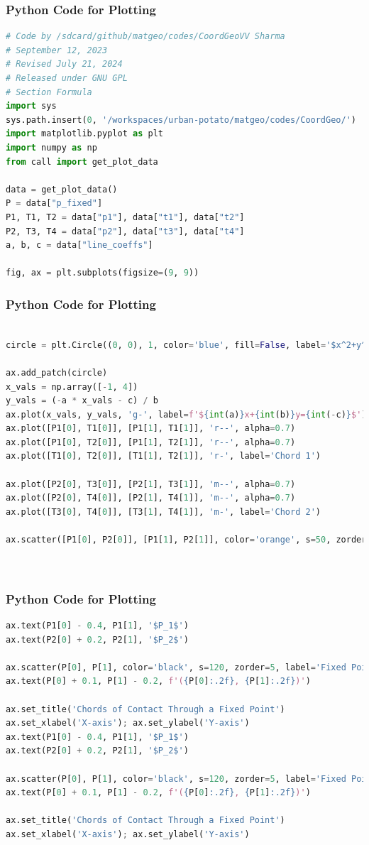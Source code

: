 \documentclass{beamer}
\theoremstyle{remark}
\numberwithin{equation}{section}
\begin{document}
\begin{frame}[fragile]
\frametitle{Python Code for Plotting}
\begin{lstlisting}[language=Python]
# Code by /sdcard/github/matgeo/codes/CoordGeoVV Sharma
# September 12, 2023
# Revised July 21, 2024
# Released under GNU GPL
# Section Formula
import sys
sys.path.insert(0, '/workspaces/urban-potato/matgeo/codes/CoordGeo/') 
import matplotlib.pyplot as plt
import numpy as np
from call import get_plot_data

data = get_plot_data()
P = data["p_fixed"]
P1, T1, T2 = data["p1"], data["t1"], data["t2"]
P2, T3, T4 = data["p2"], data["t3"], data["t4"]
a, b, c = data["line_coeffs"]

fig, ax = plt.subplots(figsize=(9, 9))


\end{lstlisting}
\end{frame}
\begin{frame}[fragile]
\frametitle{Python Code for Plotting}
\begin{lstlisting}[language=Python]

circle = plt.Circle((0, 0), 1, color='blue', fill=False, label='$x^2+y^2=1$')

ax.add_patch(circle)
x_vals = np.array([-1, 4])
y_vals = (-a * x_vals - c) / b
ax.plot(x_vals, y_vals, 'g-', label=f'${int(a)}x+{int(b)}y={int(-c)}$')
ax.plot([P1[0], T1[0]], [P1[1], T1[1]], 'r--', alpha=0.7)
ax.plot([P1[0], T2[0]], [P1[1], T2[1]], 'r--', alpha=0.7)
ax.plot([T1[0], T2[0]], [T1[1], T2[1]], 'r-', label='Chord 1')

ax.plot([P2[0], T3[0]], [P2[1], T3[1]], 'm--', alpha=0.7)
ax.plot([P2[0], T4[0]], [P2[1], T4[1]], 'm--', alpha=0.7)
ax.plot([T3[0], T4[0]], [T3[1], T4[1]], 'm-', label='Chord 2')

ax.scatter([P1[0], P2[0]], [P1[1], P2[1]], color='orange', s=50, zorder=5)

           
\end{lstlisting}
\end{frame}
 \begin{frame}[fragile]
\frametitle{Python Code for Plotting}
\begin{lstlisting}[language=Python]
ax.text(P1[0] - 0.4, P1[1], '$P_1$')
ax.text(P2[0] + 0.2, P2[1], '$P_2$')

ax.scatter(P[0], P[1], color='black', s=120, zorder=5, label='Fixed Point')
ax.text(P[0] + 0.1, P[1] - 0.2, f'({P[0]:.2f}, {P[1]:.2f})')

ax.set_title('Chords of Contact Through a Fixed Point')
ax.set_xlabel('X-axis'); ax.set_ylabel('Y-axis')
ax.text(P1[0] - 0.4, P1[1], '$P_1$')
ax.text(P2[0] + 0.2, P2[1], '$P_2$')

ax.scatter(P[0], P[1], color='black', s=120, zorder=5, label='Fixed Point')
ax.text(P[0] + 0.1, P[1] - 0.2, f'({P[0]:.2f}, {P[1]:.2f})')

ax.set_title('Chords of Contact Through a Fixed Point')
ax.set_xlabel('X-axis'); ax.set_ylabel('Y-axis')
\end{lstlisting}
\end{frame}
\end{document}
